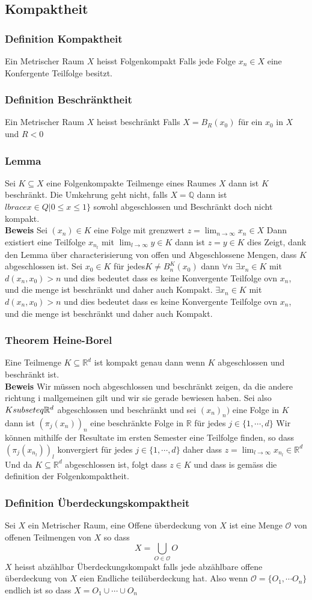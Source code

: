 \documentclass{article}
\newcommand{\beweis}{\\\textbf{Beweis }}
\newcommand{\theorem}[1]{\subsubsection*{Theorem {#1}}}
\newcommand{\lemma}[1]{\subsubsection*{Lemma {#1}}}
\newcommand{\definition}[1]{\subsubsection*{Definition {#1}}}
\begin{document}
\subsection*{Kompaktheit}
\definition{Kompaktheit} Ein Metrischer Raum $X$ heisst Folgenkompakt Falls jede Folge $x_n\in X$ eine Konfergente Teilfolge besitzt.
\definition{Beschränktheit} Ein Metrischer Raum $X$ heisst beschränkt Falls $X=B_R(x_0)$ für ein $x_0$ in $X$ und $R<0$
\lemma{} Sei $K \subseteq X$ eine Folgenkompakte Teilmenge eines Raumes $X$ dann ist $K$ beschränkt. Die Umkehrung geht nicht, falls $X=\mathbb{Q}$ dann ist $lbrace x\in Q| 0\le x \le 1\rbrace$ sowohl abgeschlossen und Beschränkt doch nicht kompakt.
\beweis Sei $(x_n)\in K$ eine Folge mit grenzwert $z=\lim_{n\rightarrow\infty}x_n\in X$ Dann existiert eine Teilfolge $x_{n_l}$ mit $\lim_{l \rightarrow\infty}y\in K$ dann ist $z=y\in K$ dies Zeigt, dank den Lemma über characterisierung von offen und Abgeschlossene Mengen, dass $K$ abgeschlossen ist.
\newline Sei $x_0\in K$ für jedes$K\neq B_n^K(x_0)$ dann $\forall n $ $\exists x_n\in K$ mit $d(x_n,x_0)>n$ und dies bedeutet dass es keine Konvergente Teilfolge ovn $x_n$, und die menge ist beschränkt und daher auch Kompakt. $\exists x_n\in K$ mit $d(x_n,x_0)>n$ und dies bedeutet dass es keine Konvergente Teilfolge ovn $x_n$, und die menge ist beschränkt und daher auch Kompakt. 
\theorem{Heine-Borel} Eine Teilmenge $K \subseteq \mathbb{R}^d$ ist kompakt genau dann wenn $K$ abgeschlossen und beschränkt ist.
\beweis Wir müssen noch abgeschlossen und beschränkt zeigen, da die andere richtung i mallgemeinen gilt und wir sie gerade bewiesen haben.
Sei also $K\\subseteq \mathbb{R}^d$ abgeschlossen und beschränkt und sei $(x_n)_n)$ eine Folge in $K$ dann ist $(\pi_j(x_n))_n$ eine beschränkte Folge in $\mathbb{R}$ für jedes $j\in \lbrace 1,\cdots, d\rbrace$
Wir können mithilfe der Resultate im ersten Semester eine Teilfolge finden, so dass $(\pi_j(x_{n_l}))_l$ konvergiert für jedes $j\in\lbrace 1,\cdots, d\rbrace$ daher dass $z=\lim_{l \rightarrow\infty}x_{n_l}\in \mathbb{R}^d$
Und da $K \subseteq \mathbb{R}^d$ abgeschlossen ist, folgt dass $z\in K$ und dass is gemäss die definition der Folgenkompaktheit. 
\definition{Überdeckungskompaktheit}
Sei $X$ ein Metrischer Raum, eine Offene überdeckung von $X$ ist eine Menge $\mathcal{O}$ von offenen Teilmengen von $X$ so dass \[X=\bigcup_{O\in \mathcal{O}}O\]
\newline $X$ heisst abzählbar Überdeckungskompakt falls jede abzählbare offene überdeckung von $X$ eien Endliche teilüberdeckung hat. Also wenn $\mathcal{O}=\lbrace O_1, \cdots O_n\rbrace$ endlich ist so dass $X=O_1\cup \cdots \cup O_n$
\end{document}
